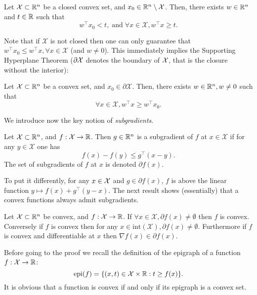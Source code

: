 \begin{theorem}
Let $\mathcal{X} \subset \mathbb{R}^n$ be a closed convex set, and $x_0 \in \mathbb{R}^n \setminus \mathcal{X}$. Then, there exists $w \in \mathbb{R}^n$ and $t \in \mathbb{R}$ such that
$$w^{\top} x_0 < t, \; \text{and} \; \forall x \in \mathcal{X}, w^{\top} x \geq t.$$
\end{theorem}

Note that if $\mathcal{X}$ is not closed then one can only guarantee that $w^{\top} x_0 \leq w^{\top} x, \forall x \in \mathcal{X}$ (and $w \neq 0$). This immediately implies the Supporting Hyperplane Theorem ($\partial \mathcal{X}$ denotes the boundary of $\mathcal{X}$, that is the closure without the interior):

\begin{theorem}
Let $\mathcal{X} \subset \mathbb{R}^n$ be a convex set, and $x_0 \in \partial \mathcal{X}$. Then, there exists $w \in \mathbb{R}^n, w \neq 0$ such that
$$\forall x \in \mathcal{X}, w^{\top} x \geq w^{\top} x_0.$$
\end{theorem}

We introduce now the key notion of {\em subgradients}.

\begin{definition}[Subgradients]
Let $\mathcal{X} \subset \mathbb{R}^n$, and $f : \mathcal{X} \rightarrow \mathbb{R}$. Then $g \in \mathbb{R}^n$ is a subgradient of $f$ at $x \in \mathcal{X}$ if for any $y \in \mathcal{X}$ one has
$$f(x) - f(y) \leq g^{\top} (x - y) .$$
The set of subgradients of $f$ at $x$ is denoted $\partial f (x)$.
\end{definition}
To put it differently, for any $x \in \mathcal{X}$ and $g \in \partial f(x)$, $f$ is above the linear function $y \mapsto f(x) + g^{\top} (y-x)$. The next result shows (essentially) that a convex functions always admit subgradients.

\begin{proposition} \label{prop:existencesubgradients}
Let $\mathcal{X} \subset \mathbb{R}^n$ be convex, and $f : \mathcal{X} \rightarrow \mathbb{R}$. If $\forall x \in \mathcal{X}, \partial f(x) \neq \emptyset$ then $f$ is convex. Conversely if $f$ is convex then for any $x \in \mathrm{int}(\mathcal{X}), \partial f(x) \neq \emptyset$. Furthermore if $f$ is convex and differentiable at $x$ then $\nabla f(x) \in \partial f(x)$. 
\end{proposition}

Before going to the proof we recall the definition of the epigraph of a function $f : \mathcal{X} \rightarrow \mathbb{R}$:
$$\mathrm{epi}(f) = \{(x,t) \in \mathcal{X} \times \mathbb{R} : t \geq f(x) \} .$$
It is obvious that a function is convex if and only if its epigraph is a convex set.

